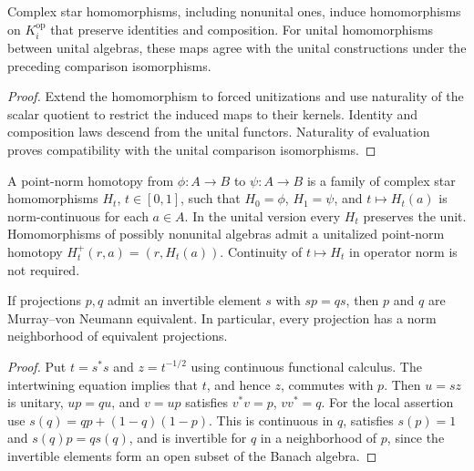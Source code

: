 \begin{proposition}\label{prop:operator-k-functoriality}
Complex star homomorphisms, including nonunital ones, induce homomorphisms
on $K_i^{\mathrm{op}}$ that preserve identities and composition.
For unital homomorphisms between unital algebras, these maps agree with the
unital constructions under the preceding comparison isomorphisms.
\end{proposition}
\begin{proof}
\leanok
Extend the homomorphism to forced unitizations and use naturality of the
scalar quotient to restrict the induced maps to their kernels. Identity and
composition laws descend from the unital functors. Naturality of evaluation
proves compatibility with the unital comparison isomorphisms.
\end{proof}

\begin{definition}\label{def:star-homotopy}
\leanok
A point-norm homotopy from $\phi:A\to B$ to $\psi:A\to B$ is a family
of complex star homomorphisms $H_t$, $t\in[0,1]$, such that $H_0=\phi$,
$H_1=\psi$, and $t\mapsto H_t(a)$ is norm-continuous for each $a\in A$.
In the unital version every $H_t$ preserves the unit. Homomorphisms of
possibly nonunital algebras admit a unitalized point-norm homotopy
$H_t^+(r,a)=(r,H_t(a))$.
Continuity of $t\mapsto H_t$ in operator norm is not required.
\end{definition}

\begin{proposition}\label{prop:projection-intertwiner-equivalence}
If projections $p,q$ admit an invertible element $s$ with $sp=qs$, then
$p$ and $q$ are Murray--von Neumann equivalent. In particular, every
projection has a norm neighborhood of equivalent projections.
\end{proposition}
\begin{proof}
\leanok
Put $t=s^*s$ and $z=t^{-1/2}$ using continuous functional calculus.
The intertwining equation implies that $t$, and hence $z$, commutes with $p$.
Then $u=sz$ is unitary, $up=qu$, and $v=up$ satisfies $v^*v=p$, $vv^*=q$.
For the local assertion use $s(q)=qp+(1-q)(1-p)$.
This is continuous in $q$, satisfies $s(p)=1$ and $s(q)p=qs(q)$,
and is invertible for $q$ in a neighborhood of $p$, since the invertible
elements form an open subset of the Banach algebra.
\end{proof}

